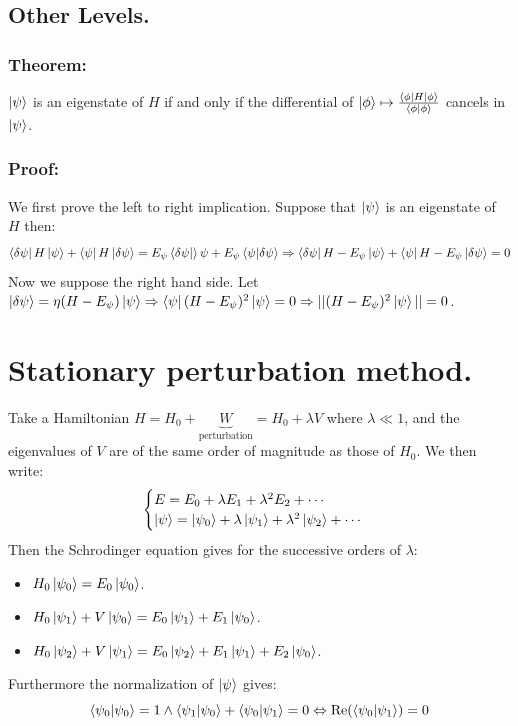 \documentclass[10pt,a4paper]{book}
\begin{document}
\subsection{Other Levels.}
\subsubsection{Theorem:}
$\ket\psi$ is an eigenstate of $H$ if and only if the differential of $\ket \phi \mapsto \frac{\bra \phi H \ket \phi}{\bra{\phi}\ket{\phi}}$ cancels in $\ket \psi$.
\subsubsection{Proof:}
We first prove the left to right implication. Suppose that $\ket \psi$ is an eigenstate of $H$ then:
\[
\bra{\delta \psi} H \ket{\psi} + \bra\psi H \ket{\delta \psi} = E_\psi \bra{\delta \psi}\ket\psi + E_\psi \bra \psi \ket{\delta \psi} \Rightarrow \bra{\delta \psi} H - E_\psi \ket\psi + \bra\psi H - E_\psi \ket{\delta \psi} = 0
\]
Now we suppose the right hand side. Let $\ket{\delta \psi} = \eta (H - E_\psi) \ket \psi \Rightarrow \bra\psi (H - E_\psi)^2 \ket \psi = 0 \Rightarrow ||(H - E_\psi)^2 \ket\psi|| = 0$.

\section{Stationary perturbation method.}
Take a Hamiltonian $H = H_0 + \underbrace{W}_{\text{perturbation}} = H_0 + \lambda V$ where $\lambda \ll 1$, and the eigenvalues of $V$ are of the same order of magnitude as those of $H_0$. We then write:
\[
\begin{cases}
E = E_0 + \lambda E_1 + \lambda^2 E_2 + \cdots\\
\ket\psi = \ket {\psi_0} + \lambda \ket{\psi_1} + \lambda^2 \ket{\psi_2} + \cdots
\end{cases}
\]
Then the Schrodinger equation gives for the successive orders of $\lambda$:
\begin{itemize}
\item $H_0 \ket{\psi_0} = E_0 \ket{\psi_0}$.
\item $H_0 \ket{\psi_1} + V \ket{\psi_0} = E_0 \ket{\psi_1} + E_1 \ket{\psi_0}$.
\item $H_0 \ket{\psi_2} + V \ket{\psi_1} = E_0 \ket{\psi_2} + E_1 \ket{\psi_1} + E_2 \ket{\psi_0}$.
\end{itemize}
Furthermore the normalization of $\ket\psi$ gives:
\[
\bra{\psi_0} \ket{\psi_0} = 1 \land \bra{\psi_1}\ket{\psi_0} + \bra{\psi_0}\ket{\psi_1} = 0 \Leftrightarrow \Re(\bra{\psi_0}\ket{\psi_1}) = 0
\] 
\end{document}
